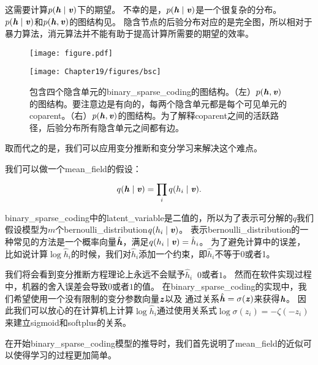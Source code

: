 这需要计算$p(\boldsymbol{\mathit{h}}\mid\boldsymbol{\mathit{v}})$下的期望。
不幸的是，$p(\boldsymbol{\mathit{h}}\mid\boldsymbol{\mathit{v}})$是一个很复杂的分布。
$p(\boldsymbol{\mathit{h}}\mid\boldsymbol{\mathit{v}})$和$p(\boldsymbol{\mathit{h}},\boldsymbol{\mathit{v}})$的图结构见。
隐含节点的后验分布对应的是完全图，所以相对于暴力算法，消元算法并不能有助于提高计算所需要的期望的效率。


\begin{figure}[!htb]
\ifOpenSource
\centerline{\texttt{[image: figure.pdf]}}
\else
	\centerline{\texttt{[image: Chapter19/figures/bsc]}}
\fi
	\caption{包含四个隐含单元的\gls{binary_sparse_coding}的图结构。（左）$p(\boldsymbol{\mathit{h}},\boldsymbol{\mathit{v}})$的图结构。要注意边是有向的，每两个隐含单元都是每个可见单元的\gls{coparent}。（右）$p(\boldsymbol{\mathit{h}},\boldsymbol{\mathit{v}})$的图结构。为了解释\gls{coparent}之间的活跃路径，后验分布所有隐含单元之间都有边。}
	\label{fig:bsc}
\end{figure}



取而代之的是，我们可以应用变分推断和变分学习来解决这个难点。


我们可以做一个\gls{mean_field}的假设：
\begin{align}
	q(\boldsymbol{\mathit{h}}\mid\boldsymbol{\mathit{v}}) = \prod_{i}^{}q(h_i\mid\boldsymbol{\mathit{v}}).
\end{align}


\gls{binary_sparse_coding}中的\gls{latent_variable}是二值的，所以为了表示可分解的$q$我们假设模型为$m$个\gls{bernoulli_distribution}$q(h_i\mid\boldsymbol{\mathit{v}})$。
表示\gls{bernoulli_distribution}的一种常见的方法是一个概率向量$\hat{\boldsymbol{\mathit{h}}}$，满足$q(h_i\mid\boldsymbol{\mathit{v}}) = \hat{h}_i$。
为了避免计算中的误差，比如说计算$\log \hat{h}_i$的时候，我们对$\hat{h}_i$添加一个约束，即$\hat{h}_i$不等于0或者1。


我们将会看到变分推断方程理论上永远不会赋予$\hat{h}_i\ $ $0$或者$1$。
然而在软件实现过程中，机器的舍入误差会导致$0$或者$1$的值。
在\gls{binary_sparse_coding}的实现中，我们希望使用一个没有限制的变分参数向量$\boldsymbol{\mathit{z}}$以及
通过关系$\hat{\boldsymbol{\mathit{h}}} = \sigma(\boldsymbol{\mathit{z}})$来获得$\boldsymbol{\mathit{h}}$。
因此我们可以放心的在计算机上计算$\log \hat{h}_i$通过使用关系式$\log \sigma(z_i) = -\zeta(-z_i)$来建立sigmoid和softplus的关系。


在开始\gls{binary_sparse_coding}模型的推导时，我们首先说明了\gls{mean_field}的近似可以使得学习的过程更加简单。


